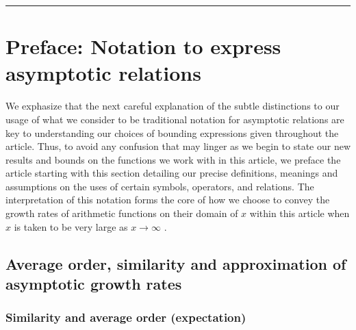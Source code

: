 \documentclass[11pt,reqno,a4letter]{article}
\numberwithin{figure}{section}
\numberwithin{table}{section}
\newcommand{\cf}{\textit{cf.\ }}
\theoremstyle{plain}
\numberwithin{theorem}{section}
\theoremstyle{definition}
\begin{document}
\bigskip\hrule\bigskip

\newpage
\label{Appendix_Glossary_NotationConvs}
     \vskip 0in
     \printglossary[type={symbols},
                    title={Reference on special notation and conventions},
                    style={glossstyleSymbol},
                    nogroupskip=true]



\newpage
\section{Preface: Notation to express asymptotic relations} 

We exphasize that the next careful explanation of the subtle distinctions to our usage of 
what we consider to be traditional notation for asymptotic relations are key to 
understanding our choices of bounding expressions given throughout the article. 
Thus, to avoid any confusion that may linger as we begin to state our new results and bounds on the 
functions we work with in this article, we preface the article starting with this section detailing 
our precise definitions, meanings and assumptions on the uses of certain symbols, operators, and 
relations. The interpretation of this notation forms the core of how we choose 
to convey the growth rates of arithmetic functions on their domain of $x$ within this article 
when $x$ is taken to be very large as $x \rightarrow \infty$ 
\cite[\cf \S 2]{NISTHB} \cite{ACOMB-BOOK}. 

\subsection{Average order, similarity and approximation of asymptotic growth rates} 

\subsubsection{Similarity and average order (expectation)} 
\end{document}
